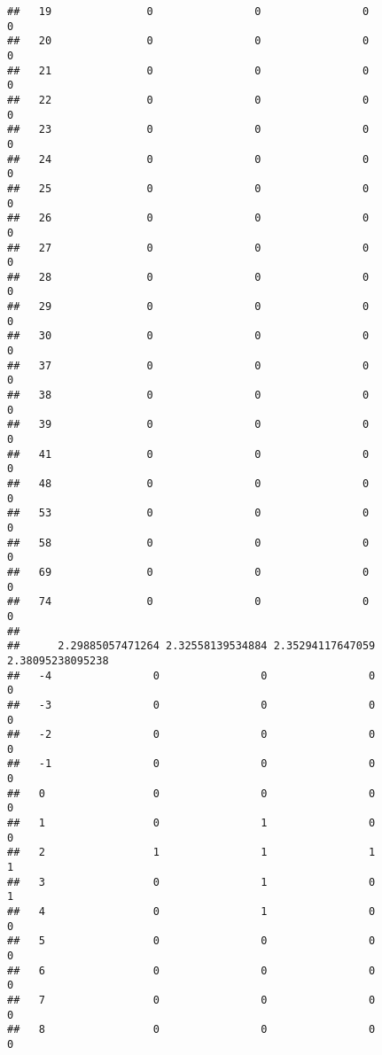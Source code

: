 \documentclass[]{article}
\begin{document}
\begin{verbatim}
##   19               0                0                0                0
##   20               0                0                0                0
##   21               0                0                0                0
##   22               0                0                0                0
##   23               0                0                0                0
##   24               0                0                0                0
##   25               0                0                0                0
##   26               0                0                0                0
##   27               0                0                0                0
##   28               0                0                0                0
##   29               0                0                0                0
##   30               0                0                0                0
##   37               0                0                0                0
##   38               0                0                0                0
##   39               0                0                0                0
##   41               0                0                0                0
##   48               0                0                0                0
##   53               0                0                0                0
##   58               0                0                0                0
##   69               0                0                0                0
##   74               0                0                0                0
##     
##      2.29885057471264 2.32558139534884 2.35294117647059 2.38095238095238
##   -4                0                0                0                0
##   -3                0                0                0                0
##   -2                0                0                0                0
##   -1                0                0                0                0
##   0                 0                0                0                0
##   1                 0                1                0                0
##   2                 1                1                1                1
##   3                 0                1                0                1
##   4                 0                1                0                0
##   5                 0                0                0                0
##   6                 0                0                0                0
##   7                 0                0                0                0
##   8                 0                0                0                0

\end{verbatim}
\end{document}
